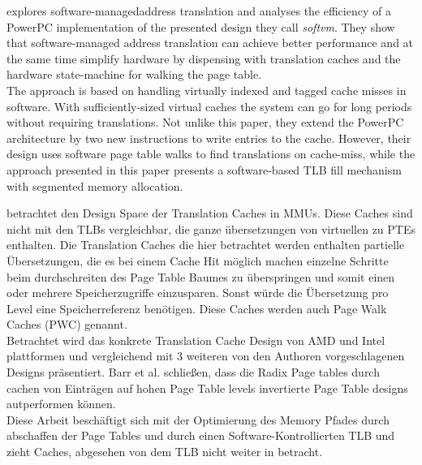 explores software-managedaddress translation and analyses the efficiency of a PowerPC implementation
of the presented design they call \textit{softvm}. They show that
software-managed address translation can achieve better performance and
at the same time simplify hardware by dispensing with translation caches and
the hardware state-machine for walking the page table.\\
The approach is based on handling virtually indexed and tagged cache misses in
software.
With sufficiently-sized virtual caches the system can go for long periods
without requiring translations.
Not unlike this paper, they extend the PowerPC architecture by two new instructions
to write entries to the cache. However, their design uses software page table
walks to find translations on cache-miss, while the approach presented in this
paper presents a software-based TLB fill mechanism with segmented
memory allocation.\\


\textbf{\cite{barrTranslationCachingSkip}}

betrachtet den Design Space der Translation Caches in MMUs. Diese Caches sind nicht mit den TLBs
vergleichbar, die ganze übersetzungen von virtuellen zu PTEs enthalten. Die Translation Caches
die hier betrachtet werden enthalten partielle Übersetzungen, die es bei einem Cache Hit möglich
machen einzelne Schritte beim durchschreiten des Page Table Baumes zu überspringen und somit
einen oder mehrere Speicherzugriffe einzusparen. Sonst würde die Übersetzung pro Level eine
Speicherreferenz benötigen. Diese Caches werden auch Page Walk Caches (PWC) \cite{yaniv2016hash} genannt.\\
Betrachtet wird das konkrete Translation Cache Design von AMD und Intel plattformen und vergleichend
mit 3 weiteren von den Authoren vorgeschlagenen Designs präsentiert. Barr et al. schließen,
dass die Radix Page tables durch cachen von Einträgen auf hohen Page Table levels invertierte Page
Table designs autperformen können.\\
Diese Arbeit beschäftigt sich mit der Optimierung des Memory Pfades durch abschaffen der Page Tables
und durch einen Software-Kontrollierten TLB und zieht Caches, abgesehen von dem TLB nicht weiter in
betracht.

